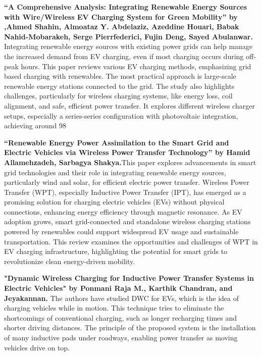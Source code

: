\documentclass[12pt]{report}
\begin{document}
\begin{Certificatepage}
\begin{center}
\begin{justify}
\vspace{10pt}
\textbf{“A Comprehensive Analysis: Integrating Renewable Energy Sources with Wire/Wireless EV Charging System for Green Mobility” 
by ,Ahmed Shahin, Almoataz Y. Abdelaziz, Azeddine Houari, Babak Nahid-Mobarakeh, Serge Pierrfederici, Fujin Deng, Sayed 
Abulanwar.} Integrating renewable energy sources with existing power grids can help manage the increased demand from EV 
charging, even if most charging occurs during off-peak hours. This paper reviews various EV charging methods, emphasizing grid
based charging with renewables. The most practical approach is large-scale renewable energy stations connected to the grid. The 
study also highlights challenges, particularly for wireless charging systems, like energy loss, coil alignment, and safe, efficient 
power transfer. It explores different wireless charger setups, especially a series-series configuration with photovoltaic integration, 
achieving around 98%

\vspace{50pt}
\textbf{“Renewable Energy Power Assimilation to the Smart Grid and Electric Vehicles via Wireless Power Transfer Technology” by 
Hamid Allamehzadeh, Sarbagya Shakya.}This paper explores advancements in smart grid technologies and their role in integrating 
renewable energy sources, particularly wind and solar, for efficient electric power transfer. Wireless Power Transfer (WPT), 
especially Inductive Power Transfer (IPT), has emerged as a promising solution for charging electric vehicles (EVs) without physical 
connections, enhancing energy efficiency through magnetic resonance. As EV adoption grows, smart grid-connected and standalone 
wireless charging stations powered by renewables could support widespread EV usage and sustainable transportation. This review 
examines the opportunities and challenges of WPT in EV charging infrastructure, highlighting the potential for smart grids to 
revolutionize clean energy-driven mobility. 

\vspace{10pt}
\textbf{"Dynamic Wireless Charging for Inductive Power Transfer Systems in Electric Vehicles" by Ponmani Raja M., Karthik Chandran, 
and Jeyakannan.} The authors have studied DWC for EVs, which is the idea of charging vehicles while in motion. This technique 
tries to eliminate the shortcomings of conventional charging, such as longer recharging times and shorter driving distances. The 
principle of the proposed system is the installation of many inductive pads under roadways, enabling power transfer as moving 
vehicles drive on top.


\end{justify}
\end{center}
\end{Certificatepage}
\end{document}
